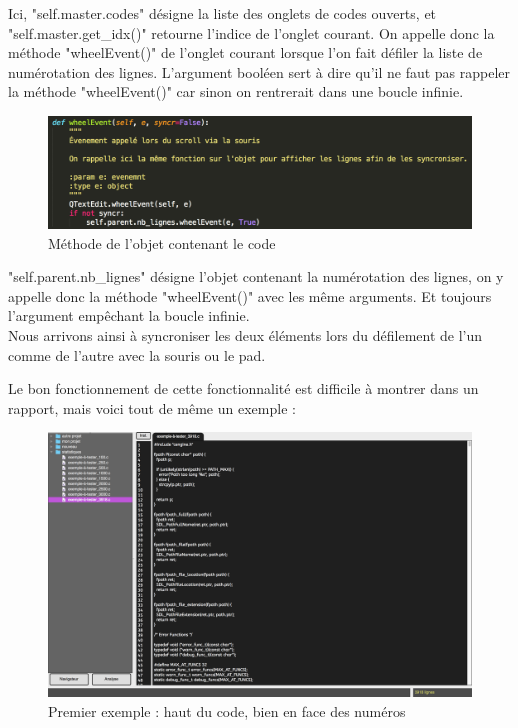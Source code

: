 \documentclass[a4paper,12pt]{article}
\begin{document}
		
		Ici, "self.master.codes" désigne la liste des onglets de codes ouverts, et "self.master.get\_idx()" retourne l'indice de l'onglet courant. On appelle donc la méthode "wheelEvent()" de l'onglet courant lorsque l'on fait défiler la liste de numérotation des lignes. L'argument booléen sert à dire qu'il ne faut pas rappeler la méthode "wheelEvent()" car sinon on rentrerait dans une boucle infinie.\\
		
		\begin{figure}[h!]
			\begin{center}
				\includegraphics[scale=0.7]{images/wheel_code}
				\caption{Méthode de l'objet contenant le code}
			\end{center}
		\end{figure}
		
		"self.parent.nb\_lignes" désigne l'objet contenant la numérotation des lignes, on y appelle donc la méthode "wheelEvent()" avec les même arguments. Et toujours l'argument empêchant la boucle infinie.\\
		
		
		Nous arrivons ainsi à syncroniser les deux éléments lors du défilement de l'un comme de l'autre avec la souris ou le pad.
		
		Le bon fonctionnement de cette fonctionnalité est difficile à montrer dans un rapport, mais voici tout de même un exemple :
		
		\begin{figure}[h!]
			\begin{center}
				\includegraphics[scale=0.2]{images/l1}
				\caption{Premier exemple : haut du code, bien en face des numéros}
			\end{center}
		\end{figure}
		
\end{document}
